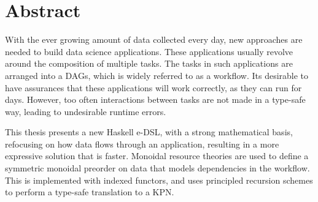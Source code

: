 \documentclass[dissertation.tex]{subfiles}
\begin{document}
\chapter*{Abstract}\label{chap:abstract}

With the ever growing amount of data collected every day, new approaches are needed to build data science applications.
These applications usually revolve around the composition of multiple tasks.
The tasks in such applications are arranged into a \acfp{DAG}, which is widely referred to as a workflow.
Its desirable to have assurances that these applications will work correctly, as they can run for days.
However, too often interactions between tasks are not made in a type-safe way, leading to undesirable runtime errors.


This thesis presents a new Haskell \acs{e-DSL}, with a strong mathematical basis, refocusing on how data flows through an application, resulting in a more expressive solution that is faster.
Monoidal resource theories are used to define a symmetric monoidal preorder on data that models dependencies in the workflow.
This is implemented with indexed functors, and uses principled recursion schemes to perform a type-safe translation to a \acf{KPN}.















\end{document}
